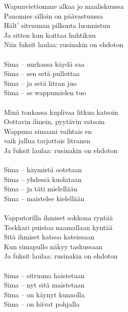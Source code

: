 
Wapunviettomme alkaa jo maaliskuussa \\
Panomies silloin on päävastuussa \\
Hält' sitruunan pilkonta luonnistuu \\
Ja sitten kun koittaa huhtikuu \\
Niin fuksit laulaa: rusinakin on ehdoton \\
\hspace{10mm} \\
Sima – nurkassa käydä saa \\
Sima – sen setä pullottaa \\
Sima – ja setä litran juo \\
Sima – se wappumielen tuo \\
\hspace{10mm} \\
Minä tonkassa kuplivaa litkua katsoin \\
Oottavin ilmein, pyytävin vatsoin \\
Wappuna simaani vaihtais en \\
vaik jallua tarjottais litranen \\
Ja fuksit laulaa: rusinakin on ehdoton \\
\hspace{10mm} \\
Sima – käymistä ootetaan \\
Sima – yhdessä kuolataan \\
Sima – ja täti mielellään \\
Sima – maistelee kielellään \\
\hspace{10mm} \\
Vapputorilla ihmiset sokkona ryntää \\
Teekkari puistoa naamallaan kyntää \\
Sitä ihmiset katsoo kateissaan \\
Kun simapullo näkyy taskussaan \\
Ja fuksit laulaa: rusinakin on ehdoton \\
\hspace{10mm} \\
Sima – sitruuna haistetaan \\
Sima – nyt sitä maistetaan \\
Sima – on käynyt kunnolla \\
Sima – on hiivat pohjalla \\
\hspace{10mm} \\
